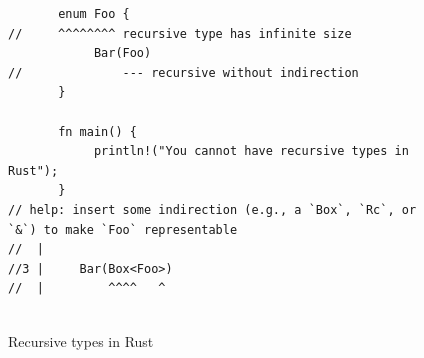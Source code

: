 \documentclass[11pt]{article}
\begin{document}
\begin{figure}[!ht]
    \centering
    \begin{verbatim}
       enum Foo { 
//     ^^^^^^^^ recursive type has infinite size
            Bar(Foo)
//              --- recursive without indirection
       }

       fn main() {
            println!("You cannot have recursive types in Rust");
       }
// help: insert some indirection (e.g., a `Box`, `Rc`, or `&`) to make `Foo` representable
//  |
//3 |     Bar(Box<Foo>)
//  |         ^^^^   ^
      
    \end{verbatim}
    \caption{Recursive types in Rust}%
    \label{fig:1}
\end{figure}

\clearpage


\end{document}

